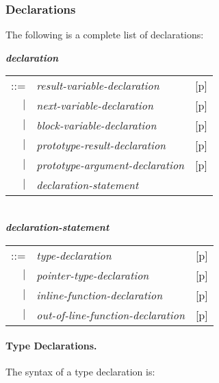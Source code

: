 \documentclass[12pt]{article}
\newcommand{\subsubsubsection}[1]{\paragraph[#1]{#1.}}
\newcommand{\emkey}[1]{{\em \bfseries #1}}
\newcommand{\pagref}[1]{p\pageref{#1}}
\newenvironment{indpar}[1][0.3in]%
	{\begin{list}{}%
		     {\setlength{\itemsep}{0in}%
		      \setlength{\topsep}{0in}%
		      \setlength{\parsep}{1ex}%
		      \setlength{\labelwidth}{#1}%
		      \setlength{\leftmargin}{#1}%
		      \addtolength{\leftmargin}{\labelsep}}%
	 \item}%
	{\end{list}}
\begin{document}
\subsubsection{Declarations}
\label{DECLARATIONS}

The following is a complete list of declarations:
\begin{indpar}
\emkey{declaration}\label{DECLARATION}
    \begin{tabular}[t]{@{}rll}
    ::= & {\em result-variable-declaration}
        & [\pagref{RESULT-VARIABLE-DECLARATION}] \\
    $|$ & {\em next-variable-declaration}
        & [\pagref{NEXT-VARIABLE-DECLARATION}] \\
    $|$ & {\em block-variable-declaration}
        & [\pagref{BLOCK-VARIABLE-DECLARATION}] \\
    $|$ & {\em prototype-result-declaration}
        & [\pagref{PROTOTYPE-RESULT-DECLARATION}] \\
    $|$ & {\em prototype-argument-declaration}
        & [\pagref{PROTOTYPE-ARGUMENT-DECLARATION}] \\
    $|$ & {\em declaration-statement} \\
    \end{tabular}
\\[0.5ex]
\emkey{declaration-statement}\label{DECLARATION-STATEMENT}
    \begin{tabular}[t]{@{}rll}
    ::= & {\em type-declaration}
        & [\pagref{TYPE-DECLARATIONS}] \\
    $|$ & {\em pointer-type-declaration}
        & [\pagref{POINTER-TYPE-DECLARATIONS}] \\
    $|$ & {\em inline-function-declaration}
        & [\pagref{INLINE-FUNCTION-DECLARATIONS}] \\
    $|$ & {\em out-of-line-function-declaration}
        & [\pagref{OUT-OF-LINE-FUNCTION-DECLARATIONS}] \\
    \end{tabular}
\end{indpar}


\subsubsubsection{Type Declarations}
\label{TYPE-DECLARATIONS}

The syntax of a type declaration is:
\end{document}
